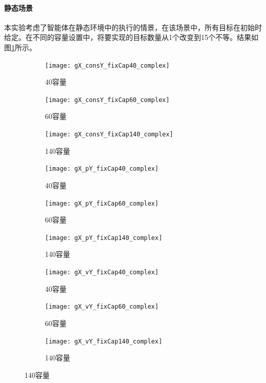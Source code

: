 \paragraph{静态场景}
本实验考虑了智能体在静态环境中的执行的情景，在该场景中，所有目标在初始时给定。在不同的容量设置中，将要实现的目标数量从1个改变到15个不等。结果如图\ref{fig:static_complex}所示。

\begin{figure}[H]
\centering
\begin{subfigure}{.32\textwidth}
  \centering
  \texttt{[image: gX\_consY\_fixCap40\_complex]}
  \caption{40容量}
  \captionsetup{justification=centering}
\end{subfigure}
\begin{subfigure}{.32\textwidth}
  \centering
  \texttt{[image: gX\_consY\_fixCap60\_complex]}
  \caption{60容量}
  \captionsetup{justification=centering}
\end{subfigure}
\begin{subfigure}{.32\textwidth}
  \centering
  \texttt{[image: gX\_consY\_fixCap140\_complex]}
  \caption{140容量}
  \captionsetup{justification=centering}
\end{subfigure}
\begin{subfigure}{.32\textwidth}
  \centering
  \texttt{[image: gX\_pY\_fixCap40\_complex]}
  \caption{40容量}
  \captionsetup{justification=centering}
\end{subfigure}
\begin{subfigure}{.32\textwidth}
  \centering
  \texttt{[image: gX\_pY\_fixCap60\_complex]}
  \caption{60容量}
  \captionsetup{justification=centering}
\end{subfigure}
\begin{subfigure}{.32\textwidth}
  \centering
  \texttt{[image: gX\_pY\_fixCap140\_complex]}
  \caption{140容量}
  \captionsetup{justification=centering}
\end{subfigure}
\begin{subfigure}{.32\textwidth}
  \centering
  \texttt{[image: gX\_vY\_fixCap40\_complex]}
  \caption{40容量}
  \captionsetup{justification=centering}
\end{subfigure}
\begin{subfigure}{.32\textwidth}
  \centering
  \texttt{[image: gX\_vY\_fixCap60\_complex]}
  \caption{60容量}
  \captionsetup{justification=centering}
\end{subfigure}
\begin{subfigure}{.32\textwidth}
  \centering
  \texttt{[image: gX\_vY\_fixCap140\_complex]}
  \caption{140容量}
  \captionsetup{justification=centering}
\end{subfigure}
\captionsetup{justification=centering}
\label{fig:static_complex}
\end{figure}
